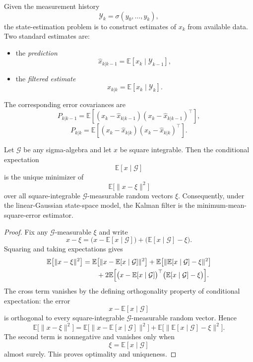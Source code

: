 \begin{definition}\label{def:l7-state-estimation-problem}
	Given the measurement history
	\[
		\mathcal{Y}_k = \sigma(y_0,\dots,y_k),
	\]
	the state-estimation problem is to construct estimates of $x_k$ from available data. Two standard estimates are:
	\begin{itemize}
		\item the \emph{prediction}
		      \[
			      \hat x_{k|k-1} = \mathbb{E}[x_k \mid \mathcal{Y}_{k-1}],
		      \]
		\item the \emph{filtered estimate}
		      \[
			      \hat x_{k|k} = \mathbb{E}[x_k \mid \mathcal{Y}_{k}].
		      \]
	\end{itemize}
\end{definition}

\begin{definition}\label{def:l7-prediction-and-filtering-error-covariances}
	The corresponding error covariances are
	\[
		P_{k|k-1}
		=
		\mathbb{E}\left[(x_k-\hat x_{k|k-1})(x_k-\hat x_{k|k-1})^\top\right],
	\]
	\[
		P_{k|k}
		=
		\mathbb{E}\left[(x_k-\hat x_{k|k})(x_k-\hat x_{k|k})^\top\right].
	\]
\end{definition}

\begin{theorem}\label{thm:l7-optimality-criterion}
	Let $\mathcal{G}$ be any sigma-algebra and let $x$ be square integrable. Then the conditional expectation
	\[
		\mathbb{E}[x \mid \mathcal{G}]
	\]
	is the unique minimizer of
	\[
		\mathbb{E}\bigl[\|x-\xi\|^2\bigr]
	\]
	over all square-integrable $\mathcal{G}$-measurable random vectors $\xi$.
	Consequently, under the linear-Gaussian state-space model, the Kalman filter is the minimum-mean-square-error estimator.
\end{theorem}
\begin{proof}
	Fix any $\mathcal{G}$-measurable $\xi$ and write
	\[
		x-\xi
		=
		\bigl(x-\mathbb{E}[x \mid \mathcal{G}]\bigr)
		+
		\bigl(\mathbb{E}[x \mid \mathcal{G}] - \xi\bigr).
	\]
	Squaring and taking expectations gives
	\begin{align*}
		\mathbb{E}\bigl[\|x-\xi\|^2\bigr]
		&=
		\mathbb{E}\bigl[\|x-\mathbb{E}[x \mid \mathcal{G}]\|^2\bigr]
		+
		\mathbb{E}\bigl[\|\mathbb{E}[x \mid \mathcal{G}] - \xi\|^2\bigr] \\
		&\qquad
		+
		2\mathbb{E}\Bigl[
		\bigl(x-\mathbb{E}[x \mid \mathcal{G}]\bigr)^\top
		\bigl(\mathbb{E}[x \mid \mathcal{G}] - \xi\bigr)
		\Bigr].
	\end{align*}
	The cross term vanishes by the defining orthogonality property of conditional expectation: the error
	\[
		x-\mathbb{E}[x \mid \mathcal{G}]
	\]
	is orthogonal to every square-integrable $\mathcal{G}$-measurable random vector. Hence
	\[
		\mathbb{E}\bigl[\|x-\xi\|^2\bigr]
		=
		\mathbb{E}\bigl[\|x-\mathbb{E}[x \mid \mathcal{G}]\|^2\bigr]
		+
		\mathbb{E}\bigl[\|\mathbb{E}[x \mid \mathcal{G}] - \xi\|^2\bigr].
	\]
	The second term is nonnegative and vanishes only when
	\[
		\xi=\mathbb{E}[x \mid \mathcal{G}]
	\]
	almost surely. This proves optimality and uniqueness.
\end{proof}


